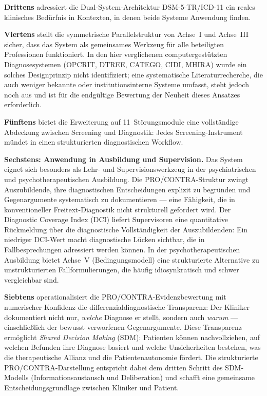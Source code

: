 \documentclass[11pt,a4paper]{article}
\begin{document}
\textbf{Drittens} adressiert die Dual-System-Architektur DSM-5-TR/ICD-11 ein reales klinisches Bed\"urfnis in Kontexten, in denen beide Systeme Anwendung finden.

\textbf{Viertens} stellt die symmetrische Parallelstruktur von Achse~I und Achse~III sicher, dass das System als gemeinsames Werkzeug f\"ur alle beteiligten Professionen funktioniert. In den hier verglichenen computergest\"utzten Diagnosesystemen (OPCRIT, DTREE, CATEGO, CIDI, MHIRA) wurde ein solches Designprinzip nicht identifiziert; eine systematische Literaturrecherche, die auch weniger bekannte oder institutionsinterne Systeme umfasst, steht jedoch noch aus und ist f\"ur die endg\"ultige Bewertung der Neuheit dieses Ansatzes erforderlich.

\textbf{F\"unftens} bietet die Erweiterung auf 11~St\"orungsmodule eine vollst\"andige Abdeckung zwischen Screening und Diagnostik: Jedes Screening-Instrument m\"undet in einen strukturierten diagnostischen Workflow.

\textbf{Sechstens: Anwendung in Ausbildung und Supervision.} Das System eignet sich besonders als Lehr- und Supervisionswerkzeug in der psychiatrischen und psychotherapeutischen Ausbildung. Die PRO/CONTRA-Struktur zwingt Auszubildende, ihre diagnostischen Entscheidungen explizit zu begr\"unden und Gegenargumente systematisch zu dokumentieren --- eine F\"ahigkeit, die in konventioneller Freitext-Diagnostik nicht strukturell gefordert wird. Der Diagnostic Coverage Index (DCI) liefert Supervisoren eine quantitative R\"uckmeldung \"uber die diagnostische Vollst\"andigkeit der Auszubildenden: Ein niedriger DCI-Wert macht diagnostische L\"ucken sichtbar, die in Fallbesprechungen adressiert werden k\"onnen. In der psychotherapeutischen Ausbildung bietet Achse~V (Bedingungsmodell) eine strukturierte Alternative zu unstrukturierten Fallformulierungen, die h\"aufig idiosynkratisch und schwer vergleichbar sind.

\textbf{Siebtens} operationalisiert die PRO/CONTRA-Evidenzbewertung mit numerischer Konfidenz die differenzialdiagnostische Transparenz: Der Kliniker dokumentiert nicht nur, \textit{welche} Diagnose er stellt, sondern auch \textit{warum} --- einschlie\ss{}lich der bewusst verworfenen Gegenargumente. Diese Transparenz erm\"oglicht \textit{Shared Decision Making} (SDM): Patienten k\"onnen nachvollziehen, auf welchen Befunden ihre Diagnose basiert und welche Unsicherheiten bestehen, was die therapeutische Allianz und die Patientenautonomie f\"ordert. Die strukturierte PRO/CONTRA-Darstellung entspricht dabei dem dritten Schritt des SDM-Modells (Informationsaustausch und Deliberation) und schafft eine gemeinsame Entscheidungsgrundlage zwischen Kliniker und Patient.
\end{document}
